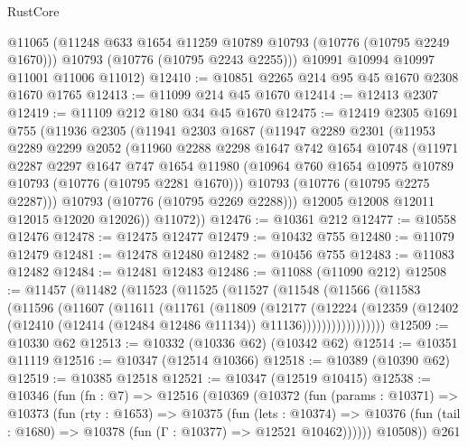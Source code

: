 \begin{lexlean}{RustCore}
\begin{coremodule}
        @11065
        (@11248 @633 @1654 @11259 @10789 @10793 (@10776 (@10795 @2249 @1670)))
        @10793
        (@10776 (@10795 @2243 @2255)))
      @10991
      @10994
      @10997
      @11001
      @11006
      @11012)
@12410 := @10851 @2265 @214 @95 @45 @1670 @2308 @1670 @1765
@12413 := @11099 @214 @45 @1670
@12414 := @12413 @2307
@12419 := @11109 @212 @180 @34 @45 @1670
@12475 := @12419
    @2305
    @1691
    @755
    (@11936
      @2305
      (@11941
        @2303
        @1687
        (@11947
          @2289
          @2301
          (@11953
            @2289
            @2299
            @2052
            (@11960
              @2288
              @2298
              @1647
              @742
              @1654
              @10748
              (@11971
                @2287
                @2297
                @1647
                @747
                @1654
                @11980
                (@10964 @760 @1654 @10975 @10789 @10793 (@10776 (@10795 @2281 @1670)))
                @10793
                (@10776 (@10795 @2275 @2287)))
              @10793
              (@10776 (@10795 @2269 @2288)))
            @12005
            @12008
            @12011
            @12015
            @12020
            @12026))
        @11072))
@12476 := @10361 @212
@12477 := @10558 @12476
@12478 := @12475 @12477
@12479 := @10432 @755
@12480 := @11079 @12479
@12481 := @12478 @12480
@12482 := @10456 @755
@12483 := @11083 @12482
@12484 := @12481 @12483
@12486 := @11088 (@11090 @212)
@12508 := @11457
    (@11482
      (@11523
        (@11525
          (@11527
            (@11548
              (@11566
                (@11583
                  (@11596
                    (@11607
                      (@11611
                        (@11761
                          (@11809
                            (@12177
                              (@12224
                                (@12359
                                  (@12402
                                    (@12410 (@12414 (@12484 @12486 @11134)) @11136)))))))))))))))))
@12509 := @10330 @62
@12513 := @10332 (@10336 @62) (@10342 @62)
@12514 := @10351 @11119
@12516 := @10347 (@12514 @10366)
@12518 := @10389 (@10390 @62)
@12519 := @10385 @12518
@12521 := @10347 (@12519 @10415)
@12538 := @10346
    (fun (fn : @7) =>
    @12516
      (@10369
        (@10372
          (fun (params : @10371) =>
          @10373
            (fun (rty : @1653) =>
            @10375
              (fun (lets : @10374) =>
              @10376 (fun (tail : @1680) => @10378 (fun (Γ : @10377) => @12521 @10462))))))
        @10508))
    @261

\end{coremodule}
\end{lexlean}
